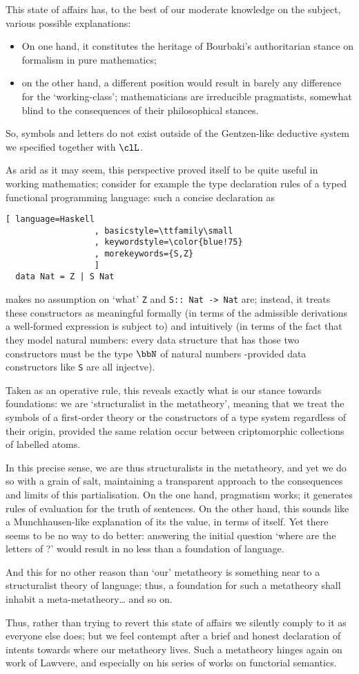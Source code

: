 This state of affairs has, to the best of our moderate knowledge on the subject, various possible explanations:
\begin{itemize}
    \item On one hand, it constitutes the heritage of Bourbaki's authoritarian stance on formalism in pure mathematics;
    \item on the other hand, a different position would result in barely any difference for the `working-class'; mathematicians are irreducible pragmatists, somewhat blind to the consequences of their philosophical stances.
\end{itemize}
So, symbols and letters do not exist outside of the Gentzen-like deductive system we specified together with $\clL$.

As arid as it may seem, this perspective proved itself to be quite useful in working mathematics; consider for example the type declaration rules of a typed functional programming language: such a concise declaration as
\begin{lstlisting}[ language=Haskell
                  , basicstyle=\ttfamily\small
                  , keywordstyle=\color{blue!75}
                  , morekeywords={S,Z}
                  ]
  data Nat = Z | S Nat
\end{lstlisting}
makes no assumption on `what' \verb|Z| and \verb|S:: Nat -> Nat| are; instead, it treats these constructors as meaningful formally (in terms of the admissible derivations a well-formed expression is subject to) and intuitively (in terms of the fact that they model natural numbers: every data structure that has those two constructors must be the type $\bbN$ of natural numbers -provided data constructors like \verb|S| are all injectve).

Taken as an operative rule, this reveals exactly what is our stance towards foundations: we are `structuralist in the metatheory', meaning that we treat the symbols of a first-order theory or the constructors of a type system regardless of their origin, provided the same relation occur between criptomorphic collections of labelled atoms.

In this precise sense, we are thus structuralists in the metatheory, and yet we do so with a grain of salt, maintaining a transparent approach to the consequences and limits of this partialisation. On the one hand, pragmatism works; it generates rules of evaluation for the truth of sentences. On the other hand, this sounds like a Munchhausen-like explanation of its the value, in terms of itself. Yet there seems to be no way to do better: answering the initial question `where are the letters of ?' would result in no less than a foundation of language.

And this for no other reason than `our' metatheory is something near to a structuralist theory of language; thus, a foundation for such a metatheory shall inhabit a meta-metatheory\dots{} and so on.

Thus, rather than trying to revert this state of affairs we silently comply to it as everyone else does; but we feel contempt after a brief and honest declaration of intents towards where our metatheory lives. Such a metatheory hinges again on work of Lawvere, and especially on his series of works on functorial semantics.
